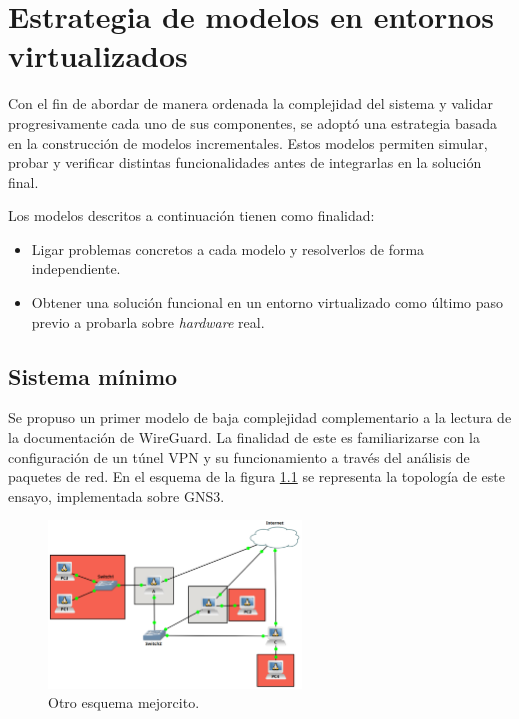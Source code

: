 \chapter{Estrategia de modelos en entornos virtualizados}

Con el fin de abordar de manera ordenada la complejidad del sistema y validar progresivamente cada uno de sus componentes, se adoptó una estrategia basada en la construcción de modelos incrementales. Estos modelos permiten simular, probar y verificar distintas funcionalidades antes de integrarlas en la solución final.

Los modelos descritos a continuación tienen como finalidad:
\begin{itemize}
    \item Ligar problemas concretos a cada modelo y resolverlos de forma independiente. %
    \item Obtener una solución funcional en un entorno virtualizado como último paso previo a probarla sobre \textit{hardware} real.
\end{itemize}





\section{Sistema mínimo}

Se propuso un primer modelo de baja complejidad complementario a la lectura de la documentación de WireGuard. La finalidad de este es familiarizarse con la configuración de un túnel VPN y su funcionamiento a través del análisis de paquetes de red. En el esquema de la figura \ref{diag:wg_minimal} se representa la topología de este ensayo, implementada sobre GNS3.

\begin{figure}[h!]
    \centering
    \includegraphics[width=0.6\textwidth]{../images/gns3_1.png}
    \caption{Otro esquema mejorcito.}
    \label{diag:wg_minimal}
\end{figure}

